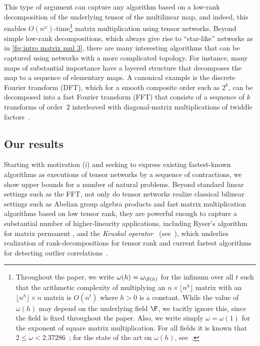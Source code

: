 This type of argument can capture any algorithm based on a low-rank
decomposition of the underlying tensor of the multilinear map, and
indeed, this enables $O(n^\omega)$-time\footnote{Throughout the paper,
we write  
%
%
  $\omega(h) = \omega_{\F(h)}$    %
for the infimum over all $t$
such that the arithmetic complexity of multiplying an
$n \times \lfloor n^h\rfloor$ matrix with an $\lfloor n^h\rfloor\times n$
matrix is $O(n^t)$ where $h>0$ is a constant.
While the value of $\omega(h)$ may depend on the underlying
field $\F$, we tacitly ignore this, since the field is fixed throughout
the paper. Also, we write simply $\omega=\omega(1)$ for the exponent
of square matrix multiplication. For all fields it is known that
$2\leq\omega<2.37286$~\cite{AlmanVW2021,LeGall2014,VassilevskaWilliams2012};
for the state of the art on $\omega(h)$,
%
see~\cite{LeGallU2017}.}{} %
 matrix multiplication
using tensor networks.
Beyond simple low-rank decompositions, which always give rise to
``star-like'' networks as in \eqref{fig:intro matrix mul 3}, there are
many interesting algorithms that can be captured using networks with a
more complicated topology.
For instance, many maps of substantial
importance have a layered structure that decomposes the map to a sequence
of elementary maps. A canonical example is the
discrete Fourier transform (DFT),
which for a smooth composite order such as $2^k$, can be decomposed
into a fast Fourier transform (FFT) that consists of a sequence
of $k$ transforms of order~$2$ interleaved with diagonal-matrix
multiplications of twiddle factors~\cite{CooleyT1965,VanLoan1992}.

\subsection{Our results}
\label{sect:our}

Starting with motivation (i) and seeking to express existing fastest-known
algorithms
as executions of tensor networks by a sequence of contractions,
we show upper bounds for a number of
natural problems. Beyond standard linear settings such as the FFT,
not only do tensor networks realize classical bilinear settings
such as Abelian group algebra products and
fast matrix multiplication algorithms based on low tensor rank,
they are powerful enough to capture a substantial number of higher-linearity
applications, including Ryser's algorithm for matrix permanent \cite{Ryser1963},
and the \emph{Kruskal operator}~\cite{Kolda2006,Kruskal1977}
(see~), %
which underlies realization of rank-decompositions for tensor rank
\cite{Kolda2009} and current fastest algorithms for detecting outlier
correlations~\cite{KarppaKK2018}.

